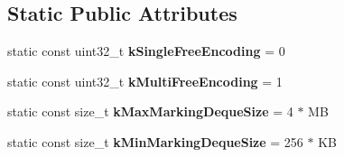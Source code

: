 \subsection*{Static Public Attributes}
\begin{DoxyCompactItemize}
\item 
static const uint32\+\_\+t {\bfseries k\+Single\+Free\+Encoding} = 0\hypertarget{classv8_1_1internal_1_1_mark_compact_collector_a989d906363b12dc6feede76fa0ca2f6e}{}\label{classv8_1_1internal_1_1_mark_compact_collector_a989d906363b12dc6feede76fa0ca2f6e}

\item 
static const uint32\+\_\+t {\bfseries k\+Multi\+Free\+Encoding} = 1\hypertarget{classv8_1_1internal_1_1_mark_compact_collector_a9540a3611cc50501fecfffa4f6f85e66}{}\label{classv8_1_1internal_1_1_mark_compact_collector_a9540a3611cc50501fecfffa4f6f85e66}

\item 
static const size\+\_\+t {\bfseries k\+Max\+Marking\+Deque\+Size} = 4 $\ast$ MB\hypertarget{classv8_1_1internal_1_1_mark_compact_collector_adf2f6c1ed30c0039d4ec729f3f4524fd}{}\label{classv8_1_1internal_1_1_mark_compact_collector_adf2f6c1ed30c0039d4ec729f3f4524fd}

\item 
static const size\+\_\+t {\bfseries k\+Min\+Marking\+Deque\+Size} = 256 $\ast$ KB\hypertarget{classv8_1_1internal_1_1_mark_compact_collector_a144e66488168536940f9ea4a59fc3de5}{}\label{classv8_1_1internal_1_1_mark_compact_collector_a144e66488168536940f9ea4a59fc3de5}

\end{DoxyCompactItemize}
